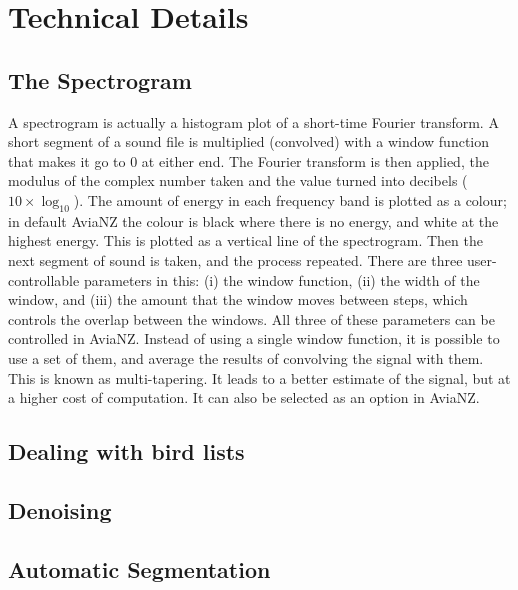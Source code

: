 \documentclass{article}
\begin{document}
%
%
%
\section{Technical Details}

\subsection{The Spectrogram}\label{sec:spectrogram}

A spectrogram is actually a histogram plot of a short-time Fourier transform. A short segment of a sound file is multiplied (convolved) with a window function that makes it go to 0 at either end. The Fourier transform is then applied, the modulus  of the complex number taken and the value turned into decibels ($10 \times \log_10$). The amount of energy in each frequency band is plotted as a colour; in default AviaNZ the colour is black where there is no energy, and white at the highest energy. This is plotted as a vertical line of the spectrogram. Then the next segment of sound is taken, and the process repeated. There are three user-controllable parameters in this: (i) the window function, (ii) the width of the window, and (iii) the amount that the window moves between steps, which controls the overlap between the windows. All three of these parameters can be controlled in AviaNZ. Instead of using a single window function, it is possible to use a set of them, and average the results of convolving the signal with them. This is known as multi-tapering. It leads to a better estimate of the signal, but at a higher cost of computation. It can also be selected as an option in AviaNZ.

\subsection{Dealing with bird lists}\label{sec:birdlists}
%
%
\subsection{Denoising}\label{sec:denoising}

\subsection{Automatic Segmentation}\label{sec:segmentation}

\end{document}
